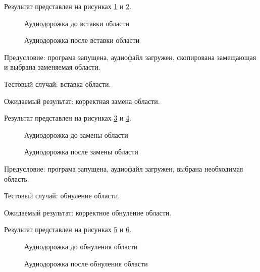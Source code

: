 Результат представлен на рисунках \ref{test_case9:image} и \ref{test_case10:image}.

\begin{figure}[H]
	\caption{Аудиодорожка до вставки области}
	\label{test_case9:image}
\end{figure}

\begin{figure}[H] 
	\caption{Аудиодорожка после вставки области}
	\label{test_case10:image}
\end{figure}

Предусловие: програма запущена, аудиофайл загружен, скопирована замещающая и выбрана заменяемая области.

Тестовый случай: вставка области.

Ожидаемый результат: корректная замена области.

Результат представлен на рисунках \ref{test_case11:image} и \ref{test_case12:image}.

\begin{figure}[H]
	\caption{Аудиодорожка до замены области}
	\label{test_case11:image}
\end{figure}

\begin{figure}[H] 
	\caption{Аудиодорожка после замены области}
	\label{test_case12:image}
\end{figure}

Предусловие: програма запущена, аудиофайл загружен, выбрана необходимая область.

Тестовый случай: обнуление области.

Ожидаемый результат: корректное обнуление области.

Результат представлен на рисунках \ref{test_case13:image} и \ref{test_case14:image}.

\begin{figure}[H]
	\caption{Аудиодорожка до обнуления области}
	\label{test_case13:image}
\end{figure}

\begin{figure}[H] 
	\caption{Аудиодорожка после обнуления области}
	\label{test_case14:image}
\end{figure}

